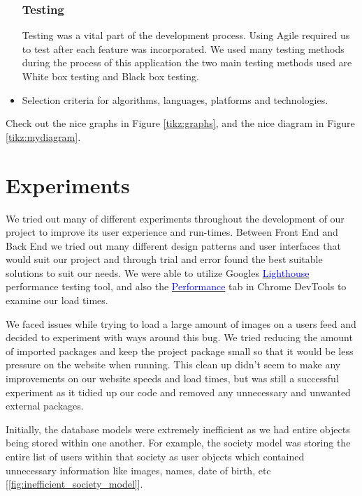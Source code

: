 \begin{itemize}
\subsection{Testing}
Testing was a vital part of the development process. Using Agile required us to test after each feature was incorporated. We used many testing methods during the process of this application the two main testing methods used are White box testing and Black box testing.
\item Selection criteria for algorithms, languages, platforms and technologies.
\end{itemize}
Check out the nice graphs in Figure \ref{tikz:graphs}, and the nice diagram in Figure \ref{tikz:mydiagram}.

\chapter{Experiments}
We tried out many of different experiments throughout the development of our project to improve its user experience and run-times. Between Front End and Back End we tried out many different design patterns and user interfaces that would suit our project and through trial and error found the best suitable solutions to suit our needs. We were able to utilize Googles \href{https://developers.google.com/web/tools/lighthouse/}{\textcolor{blue}{Lighthouse}} performance testing tool, and also the \href{https://developer.chrome.com/docs/devtools/evaluate-performance/}{\textcolor{blue}{Performance}} tab in Chrome DevTools to examine our load times.
\newline

We faced issues while trying to load a large amount of images on a users feed and decided to experiment with ways around this bug. We tried reducing the amount of imported packages and keep the project package small so that it would be less pressure on the website when running. This clean up didn't seem to make any improvements on our website speeds and load times, but was still a successful experiment as it tidied up our code and removed any unnecessary and unwanted external packages.
\newline

Initially, the database models were extremely inefficient as we had entire objects being stored within one another. For example, the society model was storing the entire list of users within that society as user objects which contained unnecessary information like images, names, date of birth, etc [\ref{fig:inefficient_society_model}].

